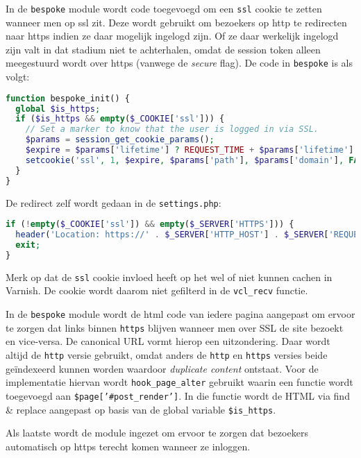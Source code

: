In de \texttt{bespoke} module wordt code toegevoegd om een \texttt{ssl} cookie te zetten wanneer men op ssl zit. Deze wordt gebruikt om bezoekers op http te redirecten naar https indien ze daar mogelijk ingelogd zijn. Of ze daar werkelijk ingelogd zijn valt in dat stadium niet te achterhalen, omdat de session token alleen meegestuurd wordt over https (vanwege de \emph{secure} flag). De code in \texttt{bespoke} is als volgt:

\begin{lstlisting}[language=PHP]
function bespoke_init() {
  global $is_https;
  if ($is_https && empty($_COOKIE['ssl'])) {
    // Set a marker to know that the user is logged in via SSL.
    $params = session_get_cookie_params();
    $expire = $params['lifetime'] ? REQUEST_TIME + $params['lifetime'] : 0;
    setcookie('ssl', 1, $expire, $params['path'], $params['domain'], FALSE, TRUE);
  }
}
\end{lstlisting}

De redirect zelf wordt gedaan in de \texttt{settings.php}:

\begin{lstlisting}[language=PHP]
if (!empty($_COOKIE['ssl']) && empty($_SERVER['HTTPS'])) {
  header('Location: https://' . $_SERVER['HTTP_HOST'] . $_SERVER['REQUEST_URI'], TRUE, 302);
  exit;
}
\end{lstlisting}

Merk op dat de \texttt{ssl} cookie invloed heeft op het wel of niet kunnen cachen in Varnish. De cookie wordt daarom niet gefilterd in de \texttt{vcl\_recv} functie.

In de \texttt{bespoke} module wordt de html code van iedere pagina aangepast om ervoor te zorgen dat links binnen \texttt{https} blijven wanneer men over SSL de site bezoekt en vice-versa. De canonical URL vormt hierop een uitzondering. Daar wordt altijd de \texttt{http} versie gebruikt, omdat anders de \texttt{http} en \texttt{https} versies beide ge\"{i}ndexeerd kunnen worden waardoor \emph{duplicate content} ontstaat. Voor de implementatie hiervan wordt \texttt{hook\_page\_alter} gebruikt waarin een functie wordt toegevoegd aan \texttt{\$page['\#post\_render']}. In die functie wordt de HTML via find \& replace aangepast op basis van de global variable \texttt{\$is\_https}.

Als laatste wordt de  module ingezet om ervoor te zorgen dat bezoekers automatisch op https terecht komen wanneer ze inloggen.

